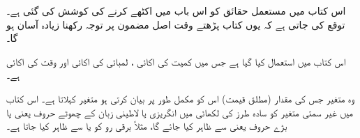 اس کتاب میں مستعمل حقائق کو اس باب میں اکٹھے کرنے کی کوشش کی گئی ہے۔ توقع کی جاتی ہے کہ یوں کتاب پڑھتے وقت اصل مضمون پر توجہ رکھنا زیادہ آسان ہو گا۔

اس کتاب میں   استعمال کیا گیا ہے جس میں کمیت کی اکائی ،  لمبائی کی اکائی  اور وقت کی اکائی  ہے۔

وہ متغیر جس کی مقدار (مطلق قیمت) اس کو مکمل طور پر بیان کرتی ہو    متغیر کہلاتا ہے۔ اس کتاب میں غیر سمتی متغیر کو سادہ طرز کی لکھائی میں انگریزی یا لاطینی زبان کے چھوٹے حروف  یعنی   یا بڑے حروف یعنی   سے ظاہر کیا جائے گا، مثلاً برقی رو کو  یا  سے ظاہر کیا جاتا ہے۔

